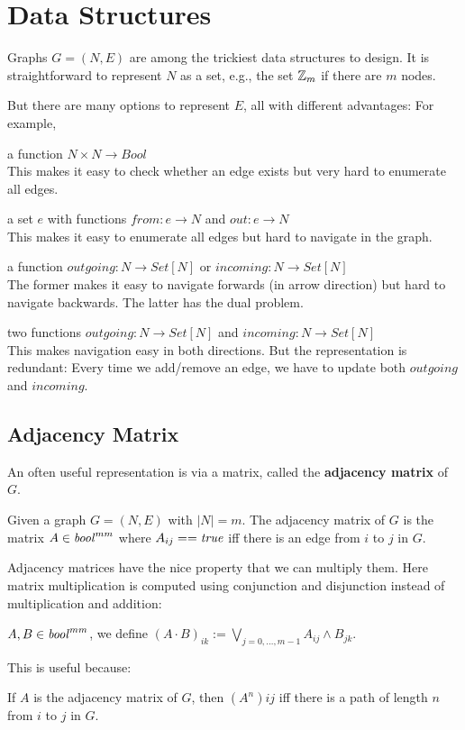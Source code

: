 \section{Data Structures}

Graphs $G=(N,E)$ are among the trickiest data structures to design.
It is straightforward to represent $N$ as a set, e.g., the set $\mathbb{Z}_m$ if there are $m$ nodes.

But there are many options to represent $E$, all with different advantages:
For example,
\begin{compactitem}
 \item a function $N\times N\to Bool$\\
 This makes it easy to check whether an edge exists but very hard to enumerate all edges.
 \item a set $e$ with functions $from: e\to N$ and $out:e\to N$\\
 This makes it easy to enumerate all edges but hard to navigate in the graph.
 \item a function $outgoing:N\to Set[N]$ or $incoming:N\to Set[N]$\\
 The former makes it easy to navigate forwards (in arrow direction) but hard to navigate backwards.
 The latter has the dual problem.\\
 \item two functions $outgoing:N\to Set[N]$ and $incoming:N\to Set[N]$ \\
 This makes navigation easy in both directions. But the representation is redundant: Every time we add/remove an edge, we have to update both $outgoing$ and $incoming$.
\end{compactitem}

\subsection{Adjacency Matrix}

An often useful representation is via a matrix, called the \textbf{adjacency matrix} of $G$.

\begin{definition}
Given a graph $G=(N,E)$ with $|N|=m$.
The adjacency matrix of $G$ is the matrix $A\in \mathit{bool}^{mm}$ where $A_{ij}==\mathit{true}$ iff there is an edge from $i$ to $j$ in $G$.
\end{definition}

Adjacency matrices have the nice property that we can multiply them.
Here matrix multiplication is computed using conjunction and disjunction instead of multiplication and addition:
\begin{definition}
$A,B\in \mathit{bool}^{mm}$, we define $(A\cdot B)_{ik}:= \bigvee_{j=0,\ldots,m-1}A_{ij}\wedge B_{jk}$.
\end{definition}
This is useful because:
\begin{theorem}
If $A$ is the adjacency matrix of $G$, then $(A^n){ij}$ iff there is a path of length $n$ from $i$ to $j$ in $G$.
\end{theorem}

